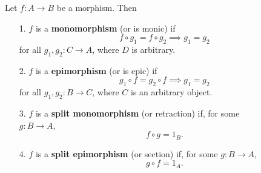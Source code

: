     \begin{minipage}{0.8\textwidth}
        \begin{definition}
            Let $f: A \to B$ be a morphism. Then 
            \begin{itemize}
                \item[1.] $f$ is a \textbf{monomorphism} (or is monic) if
                \[ 
                    f \circ g_1 = f \circ g_2 \implies g_1 = g_2
                \]
                for all
                $g_1,g_2 : C \to A$, where $D$ is arbitrary.
                \item[2.] $f$ is a \textbf{epimorphism} (or is epic) if 
                \[ 
                    g_1 \circ f  = g_2 \circ f \implies g_1 = g_2
                \]
                for all $g_1, g_2 : B \to C$, where $C$ is an arbitrary
                object. 
                \item[3.] $f $ is a \textbf{split monomorphism} (or retraction)
                if, for some\\
                $g: B \to A$, 
                \[
                    f  \circ g = 1_B.  
                \]
                \item[4.] $f $ is a \textbf{split epimorphism} (or section) if, for some
                $g: B \to A$, 
                \[
                    g \circ f  = 1_A.
                \]
            \end{itemize}
        \end{definition}
    \end{minipage}
    \hspace{-2cm}
